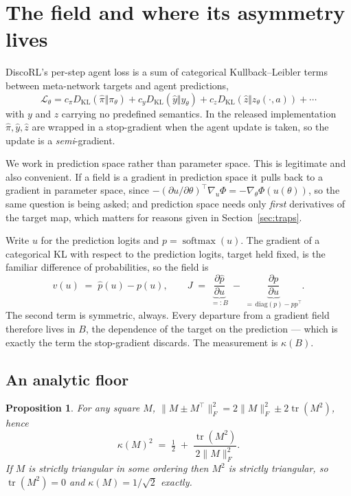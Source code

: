 \documentclass[11pt]{article}
\newtheorem{proposition}{Proposition}
\theoremstyle{remark}
\newcommand{\tr}{\operatorname{tr}}
\newcommand{\KL}{D_{\mathrm{KL}}}
\begin{document}
\section{The field and where its asymmetry lives}

DiscoRL's per-step agent loss is a sum of categorical Kullback--Leibler terms
between meta-network targets and agent predictions,
\begin{equation}
  \mathcal{L}_\theta = c_\pi \KL(\hat\pi \Vert \pi_\theta)
  + c_y \KL(\hat y \Vert y_\theta)
  + c_z \KL(\hat z \Vert z_\theta(\cdot, a)) + \cdots
  \label{eq:loss}
\end{equation}
with $y$ and $z$ carrying no predefined semantics. In the released
implementation $\hat\pi, \hat y, \hat z$ are wrapped in a stop-gradient when the
agent update is taken, so the update is a \emph{semi}-gradient.

We work in prediction space rather than parameter space. This is legitimate and
also convenient. If a field is a gradient in prediction space it pulls back to a
gradient in parameter space, since $-(\partial u / \partial\theta)^\top \nabla_u
\Phi = -\nabla_\theta \Phi(u(\theta))$, so the same question is being asked; and
prediction space needs only \emph{first} derivatives of the target map, which
matters for reasons given in Section~\ref{sec:traps}.

Write $u$ for the prediction logits and $p = \operatorname{softmax}(u)$. The
gradient of a categorical KL with respect to the prediction logits, target held
fixed, is the familiar difference of probabilities, so the field is
\begin{equation}
  v(u) \;=\; \hat p(u) - p(u), \qquad
  J \;=\; \underbrace{\frac{\partial \hat p}{\partial u}}_{=: B}
  \;-\; \underbrace{\frac{\partial p}{\partial u}}_{=\, \mathrm{diag}(p) - pp^\top}.
  \label{eq:field}
\end{equation}
The second term is symmetric, always. Every departure from a gradient field
therefore lives in $B$, the dependence of the target on the prediction --- which
is exactly the term the stop-gradient discards. The measurement is $\kappa(B)$.

\subsection{An analytic floor}

\begin{proposition}\label{prop:floor}
For any square $M$,
$\lVert M \pm M^\top\rVert_F^2 = 2\lVert M\rVert_F^2 \pm 2\tr(M^2)$, hence
\begin{equation}
  \kappa(M)^2 \;=\; \tfrac12 \;+\; \frac{\tr(M^2)}{2\lVert M \rVert_F^2}.
  \label{eq:kappa-tr}
\end{equation}
If $M$ is strictly triangular in some ordering then $M^2$ is strictly triangular,
so $\tr(M^2) = 0$ and $\kappa(M) = 1/\sqrt 2$ exactly.
\end{proposition}
\end{document}
